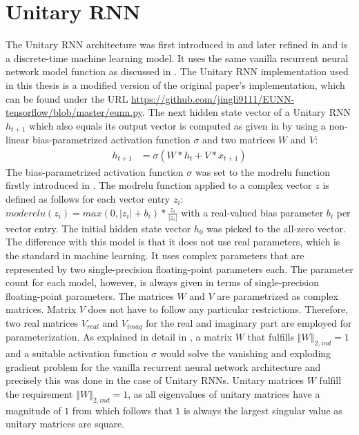 \documentclass[draft,final]{vutinfth} %
\begin{document}
    \section{Unitary RNN} \label{urnn}
    The Unitary RNN architecture was first introduced in \cite{UnitaryRNNs} and later refined in \cite{EfficientUnitaryRNNs} and is a discrete-time machine learning model.
    It uses the same vanilla recurrent neural network model function as discussed in .
    The Unitary RNN implementation used in this thesis is a modified version of the original paper's implementation, which can be found under the URL \url{https://github.com/jingli9111/EUNN-tensorflow/blob/master/eunn.py}.
    The next hidden state vector of a Unitary RNN $h_{t+1}$ which also equals its output vector is computed as given in \cite[p. 2]{EfficientUnitaryRNNs} by using a non-linear bias-parametrized activation function $\sigma$ and two matrices $W$ and $V$:
    \begin{align}
        \label{urnn_state}
        h_{t+1} &= \sigma(W*h_t + V*x_{t+1})
    \end{align}
    The bias-parametrized activation function $\sigma$ was set to the modrelu function firstly introduced in \cite[p. 4]{UnitaryRNNs}.
    The modrelu function applied to a complex vector $z$ is defined as follows for each vector entry $z_i$: $moderelu(z_i) = max(0, |z_i|+b_i) * \frac{z_i}{|z_i|}$ with a real-valued bias parameter $b_i$ per vector entry.
    The initial hidden state vector $h_0$ was picked to the all-zero vector.
    The difference with this model is that it does not use real parameters, which is the standard in machine learning.
    It uses complex parameters that are represented by two single-precision floating-point parameters each.
    The parameter count for each model, however, is always given in terms of single-precision floating-point parameters.
    The matrices $W$ and $V$ are parametrized as complex matrices.
    Matrix $V$ does not have to follow any particular restrictions. Therefore, two real matrices $V_{real}$ and $V_{imag}$ for the real and imaginary part are employed for parameterization.
    As explained in detail in , a matrix $W$ that fulfills $\left\Vert W \right\Vert_{2,ind} = 1$ and a suitable activation function $\sigma$ would solve the vanishing and exploding gradient problem for the vanilla recurrent neural network architecture and precisely this was done in the case of Unitary RNNs.
    Unitary matrices $W$ fulfill the requirement $\left\Vert W \right\Vert_{2,ind} = 1$, as all eigenvalues of unitary matrices have a magnitude of $1$ from which follows that $1$ is always the largest singular value as unitary matrices are square.
\end{document}
